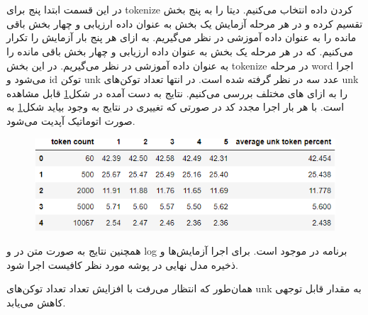 \documentclass[10pt]{article}
\begin{document}
\section{
}

در این قسمت ابتدا پنج 
برای tokenize کردن داده انتخاب می‌کنیم. دیتا را به پنج بخش تقسیم کرده و در هر مرحله آزمایش یک بخش به عنوان داده ارزیابی و چهار بخش باقی مانده را به عنوان داده آموزشی در نظر می‌گیریم. به ازای هر
پنج بار آزمایش را تکرار می‌کنیم. که در هر مرحله یک بخش به عنوان داده ارزیابی و چهار بخش باقی مانده را به عنوان داده آموزشی در نظر می‌گیریم. در این بخش tokenize در مرحله word اجرا می‌شود و  id توکن unk عدد سه در نظر گرفته شده است.	 در انتها تعداد توکن‌های unk را به ازای
های مختلف بررسی می‌کنیم. نتایج به دست آمده در شکل\ref{tok} قابل مشاهده است. با هر بار اجرا مجدد کد در صورتی که تغییری در نتایج به وجود بیاید شکل\ref{tok} به صورت اتوماتیک آپدیت می‌شود.
\begin{figure}[ht!]
	\centering\includegraphics[width=\linewidth]{../reports/tokenization.png}
	\caption{
		}
	\label{tok}
\end{figure}

همچنین نتایج به صورت متن در
و log برنامه در 
موجود است. برای اجرا آزمایش‌ها و ذخیره مدل نهایی در پوشه مورد نظر کافیست 
اجرا شود.

همان‌طور که انتظار می‌رفت با افزایش تعداد
تعداد توکن‌های unk به مقدار قابل توجهی کاهش می‌یابد.
\newpage

\section{
}
\end{document}
